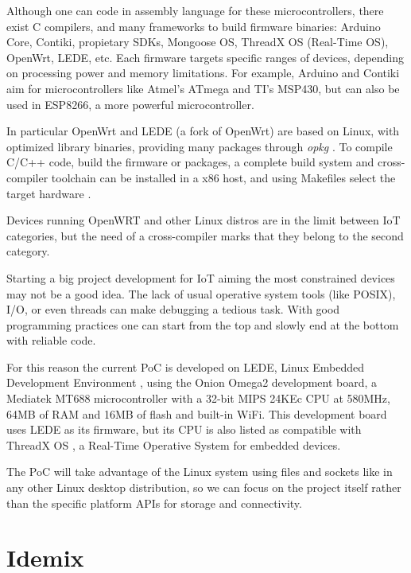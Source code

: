 Although one can code in assembly language for these microcontrollers, there exist C compilers, and many frameworks to build firmware binaries: Arduino Core, Contiki, propietary SDKs, Mongoose OS, ThreadX OS (Real-Time OS), OpenWrt, LEDE, etc. Each firmware targets specific ranges of devices, depending on processing power and memory limitations. For example, Arduino and Contiki aim for microcontrollers like Atmel's ATmega and TI's MSP430, but can also be used in ESP8266, a more powerful microcontroller.

In particular OpenWrt and LEDE (a fork of OpenWrt) are based on Linux, with optimized library binaries, providing many packages through \textit{opkg} \citep{opkg}. To compile C/C++ code, build the firmware or packages, a complete build system and cross-compiler toolchain can be installed in a x86 host, and using Makefiles select the target hardware \citep{openwrtbuildsystem}.

Devices running OpenWRT and other Linux distros are in the limit between \ac{IoT} categories, but the need of a cross-compiler marks that they belong to the second category.

Starting a big project development for \ac{IoT} aiming the most constrained devices may not be a good idea. The lack of usual operative system tools (like POSIX), I/O, or even threads can make debugging a tedious task. With good programming practices one can start from the top and slowly end at the bottom with reliable code.

For this reason the current \ac{PoC} is developed on LEDE, Linux Embedded Development Environment \citep{ledeproject}, using the Onion Omega2 development board, a Mediatek MT688 microcontroller \citep{MT7688} with a 32-bit MIPS 24KEc CPU at 580MHz, 64MB of RAM and 16MB of flash and built-in WiFi. This development board uses LEDE as its firmware, but its CPU is also listed as compatible with ThreadX OS \citep{THREADX}, a Real-Time Operative System for embedded devices.

The \ac{PoC} will take advantage of the Linux system using files and sockets like in any other Linux desktop distribution, so we can focus on the project itself rather than the specific platform APIs for storage and connectivity.




\section{Idemix}

